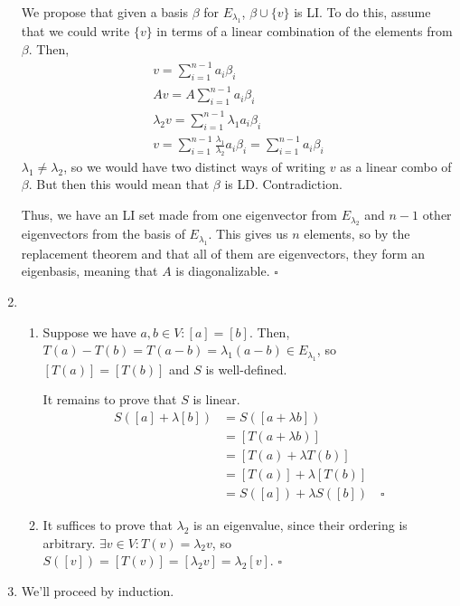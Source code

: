 \documentclass[12pt]{article}
\begin{document}
\begin{enumerate}
            We propose that given a basis $\beta$ for $E_{\lambda_1}$, $\beta \cup \{v\}$ is LI.
            To do this, assume that we could write $\{v\}$ in terms of a linear combination of the elements from $\beta$.
            Then,
            \begin{gather*}
                  v=\sum_{i=1}^{n-1} a_i\beta_i \\
                  Av=A\sum_{i=1}^{n-1} a_i\beta_i \\
                  \lambda_2 v=\sum_{i=1}^{n-1} \lambda_1 a_i\beta_i \\
                  v=\sum_{i=1}^{n-1} \frac{\lambda_1}{\lambda_2} a_i\beta_i=\sum_{i=1}^{n-1} a_i\beta_i
            \end{gather*}
            $\lambda_1 \ne \lambda_2$, so we would have two distinct ways of writing $v$ as a linear combo of $\beta$.
            But then this would mean that $\beta$ is LD.
            Contradiction.

            Thus, we have an LI set made from one eigenvector from $E_{\lambda_2}$ and $n-1$ other eigenvectors from the basis of $E_{\lambda_1}$.
            This gives us $n$ elements, so by the replacement theorem and that all of them are eigenvectors,
            they form an eigenbasis, meaning that $A$ is diagonalizable. $\square$

      \item \begin{enumerate}
                  \item Suppose we have $a, b \in V: [a]=[b]$.
                        Then, $T(a)-T(b)=T(a-b)=\lambda_1(a-b) \in E_{\lambda_1}$, so $[T(a)]=[T(b)]$ and $S$ is well-defined.

                        It remains to prove that $S$ is linear.
                        \begin{align*}
                              S([a]+\lambda[b]) & = S([a+\lambda b])                  \\
                                                & =[T(a+\lambda b)]                   \\
                                                & =[T(a)+\lambda T(b)]                \\
                                                & =[T(a)]+\lambda[T(b)]               \\
                                                & = S([a])+\lambda S([b])\quad\square
                        \end{align*}
                  \item It suffices to prove that $\lambda_2$ is an eigenvalue, since their ordering is arbitrary.
                        $\exists v \in V: T(v)=\lambda_2 v$, so $S([v])=[T(v)]=[\lambda_2 v]=\lambda_2 [v]$. $\square$
            \end{enumerate}
      \item We'll proceed by induction.


\end{enumerate}
\end{document}
